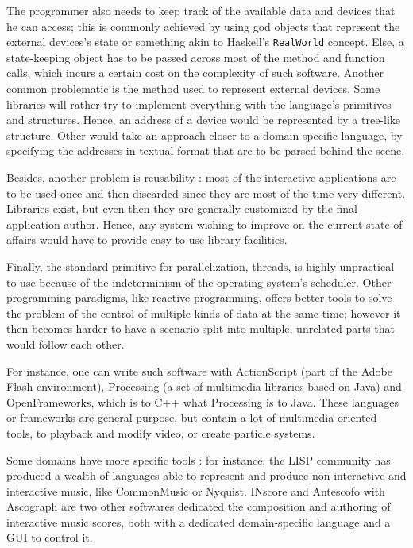 \documentclass{sigchi}
\begin{document}
The programmer also needs to keep track of the available data and devices that he can access; this is commonly achieved by using god objects that represent the external devices's state or something akin to Haskell's \texttt{RealWorld} concept\cite{launchbury1995state}. Else, a state-keeping object has to be passed across most of the method and function calls, which incurs a certain cost on the complexity of such software. Another common problematic is the method used to represent external devices. Some libraries will rather try to implement everything with the language's primitives and structures. Hence, an address of a device would be represented by a tree-like structure. Other would take an approach closer to a domain-specific language, by specifying the addresses in textual format that are to be parsed behind the scene. 

Besides, another problem is reusability : most of the interactive applications are to be used once and then discarded since they are most of the time very different. Libraries exist, but even then they are generally customized by the final application author. Hence, any system wishing to improve on the current state of affairs would have to provide easy-to-use library facilities.

Finally, the standard primitive for parallelization, threads, is highly unpractical to use because of the indeterminism of the operating system's scheduler. Other programming paradigms, like reactive programming, offers better tools to solve the problem of the control of multiple kinds of data at the same time; however it then becomes harder to have a scenario split into multiple, unrelated parts that would follow each other.

For instance, one can write such software with ActionScript (part of the Adobe Flash environment), Processing (a set of multimedia libraries based on Java) and OpenFrameworks, which is to C++ what Processing is to Java\cite{noble2009programming}. These languages or frameworks are general-purpose, but contain a lot of multimedia-oriented tools, to playback and modify video, or create particle systems. 

Some domains have more specific tools : for instance, the LISP community has produced a wealth of languages able to represent and produce non-interactive and interactive music, like CommonMusic\cite{taube1997introduction} or Nyquist\cite{dannenbergnyquist}. INscore\cite{fober2013programming} and Antescofo with Ascograph\cite{coffy2014ascograph} are two other softwares dedicated the composition and authoring of interactive music scores, both with a dedicated domain-specific language and a GUI to control it.
\end{document}
